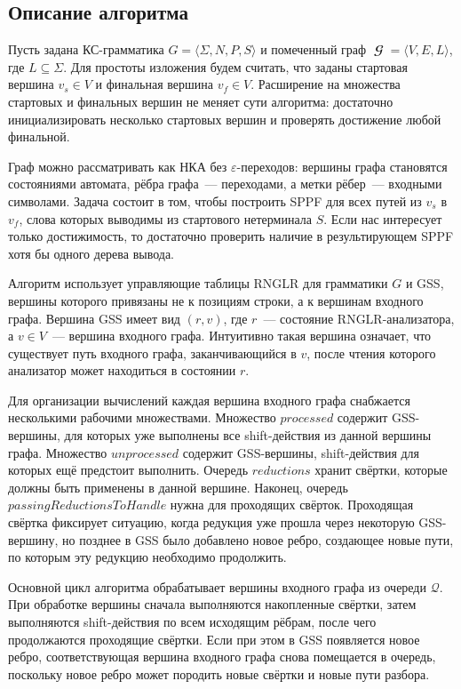 \subsection{Описание алгоритма}
\label{subsec:CFPQ_GLR_description}

Пусть задана КС-грамматика $G = \langle \Sigma, N, P, S \rangle$ и помеченный граф $\mbfscrG = \langle V, E, L \rangle$, где $L \subseteq \Sigma$.
Для простоты изложения будем считать, что заданы стартовая вершина $v_s \in V$ и финальная вершина $v_f \in V$.
Расширение на множества стартовых и финальных вершин не меняет сути алгоритма: достаточно инициализировать несколько стартовых вершин и проверять достижение любой финальной.

Граф можно рассматривать как НКА без $\varepsilon$-переходов: вершины графа становятся состояниями автомата, рёбра графа~--- переходами, а метки рёбер~--- входными символами.
Задача состоит в том, чтобы построить SPPF для всех путей из $v_s$ в $v_f$, слова которых выводимы из стартового нетерминала $S$.
Если нас интересует только достижимость, то достаточно проверить наличие в результирующем SPPF хотя бы одного дерева вывода.

Алгоритм использует управляющие таблицы RNGLR для грамматики $G$ и GSS, вершины которого привязаны не к позициям строки, а к вершинам входного графа.
Вершина GSS имеет вид $(r, v)$, где $r$~--- состояние RNGLR-анализатора, а $v \in V$~--- вершина входного графа.
Интуитивно такая вершина означает, что существует путь входного графа, заканчивающийся в $v$, после чтения которого анализатор может находиться в состоянии $r$.

Для организации вычислений каждая вершина входного графа снабжается несколькими рабочими множествами.
Множество $\mathit{processed}$ содержит GSS-вершины, для которых уже выполнены все shift-действия из данной вершины графа.
Множество $\mathit{unprocessed}$ содержит GSS-вершины, shift-действия для которых ещё предстоит выполнить.
Очередь $\mathit{reductions}$ хранит свёртки, которые должны быть применены в данной вершине.
Наконец, очередь $\mathit{passingReductionsToHandle}$ нужна для проходящих свёрток.
Проходящая свёртка фиксирует ситуацию, когда редукция уже прошла через некоторую GSS-вершину, но позднее в GSS было добавлено новое ребро, создающее новые пути, по которым эту редукцию необходимо продолжить.

Основной цикл алгоритма обрабатывает вершины входного графа из очереди $\mathcal{Q}$.
При обработке вершины сначала выполняются накопленные свёртки, затем выполняются shift-действия по всем исходящим рёбрам, после чего продолжаются проходящие свёртки.
Если при этом в GSS появляется новое ребро, соответствующая вершина входного графа снова помещается в очередь, поскольку новое ребро может породить новые свёртки и новые пути разбора.

